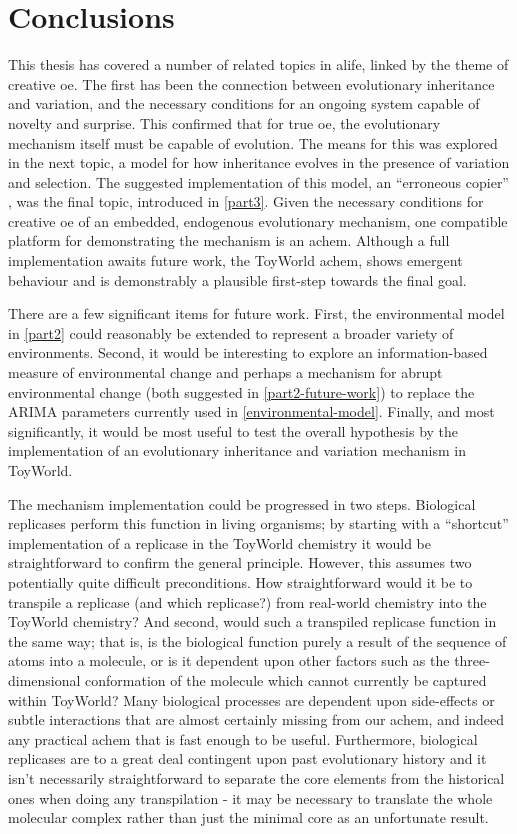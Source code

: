 \chapter{Conclusions}\label{thesis-conclusions}

This thesis has covered a number of related topics in \gls{alife}, linked by the theme of creative \gls{oe}. The first has been the connection between evolutionary inheritance and variation, and the necessary conditions for an ongoing system capable of novelty and surprise. This confirmed that for true \gls{oe}, the evolutionary mechanism itself must be capable of evolution. The means for this was explored in the next topic, a model for how inheritance evolves in the presence of variation and selection. The suggested implementation of this model, an ``erroneous copier'' \parencite[p.16]{Zachar2010}, was the final topic, introduced in \cref{part3}. Given the necessary conditions for creative \gls{oe} of an embedded, endogenous evolutionary mechanism, one compatible platform for demonstrating the mechanism is an \gls{achem}. Although a full implementation awaits future work, the ToyWorld \gls{achem}, shows emergent behaviour and is demonstrably a plausible first-step towards the final goal.

There are a few significant items for future work. First, the environmental model in \cref{part2} could reasonably be extended to represent a broader variety of environments. Second, it would be interesting to explore an information-based measure of environmental change and perhaps a mechanism for abrupt environmental change (both suggested in \cref{part2-future-work}) to replace the ARIMA parameters currently used in \cref{environmental-model}. Finally, and most significantly, it would be most useful to test the overall hypothesis by the implementation of an evolutionary inheritance and variation mechanism in ToyWorld.

The mechanism implementation could be progressed in two steps. Biological replicases perform this function in living organisms; by starting with a ``shortcut'' implementation of a replicase in the ToyWorld chemistry it would be straightforward to confirm the general principle. However, this assumes two potentially quite difficult preconditions. How straightforward would it be to transpile a replicase (and which replicase?) from real-world chemistry into the ToyWorld chemistry? And second, would such a transpiled replicase function in the same way; that is, is the biological function purely a result of the sequence of atoms into a molecule, or is it dependent upon other factors such as the three-dimensional conformation of the molecule which cannot currently be captured within ToyWorld? Many biological processes are dependent upon side-effects or subtle interactions that are almost certainly missing from our \gls{achem}, and indeed any practical \gls{achem} that is fast enough to be useful. Furthermore, biological replicases are to a great deal contingent upon past evolutionary history and it isn't necessarily straightforward to separate the core elements from the historical ones when doing any transpilation - it may be necessary to translate the whole molecular complex rather than just the minimal core as an unfortunate result.

